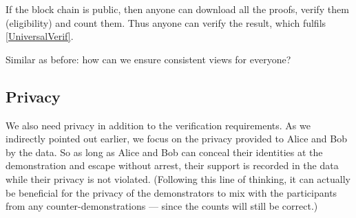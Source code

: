 If the block chain is public, then anyone can download all the proofs, verify 
them (eligibility) and count them.
Thus anyone can verify the result, which fulfils \cref{UniversalVerif}.

\begin{frame}

  \pause

  \begin{question}
    Similar as before: how can we ensure consistent views for everyone?
  \end{question}
\end{frame}

\subsection{Privacy}
\label{Privacy}

We also need privacy in addition to the verification requirements.
As we indirectly pointed out earlier, we focus on the privacy provided to Alice 
and Bob by the data.
So as long as Alice and Bob can conceal their identities at the demonstration 
and escape without arrest, their support is recorded in the data while their 
privacy is not violated.
(Following this line of thinking, it can actually be beneficial for the privacy 
of the demonstrators to mix with the participants from any 
counter-demonstrations --- since the counts will still be correct.)

